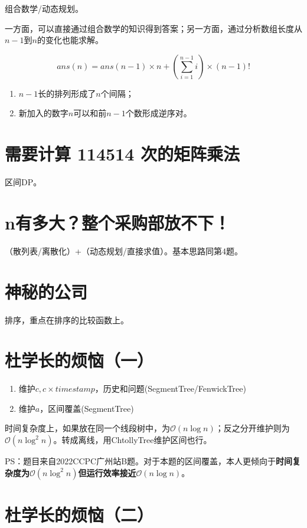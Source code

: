\documentclass[12pt, UTF8]{ctexart}
\theoremstyle{mystyle}
\begin{document}
组合数学/动态规划。\par
一方面，可以直接通过组合数学的知识得到答案；另一方面，通过分析数组长度从$n-1$到$n$的变化也能求解。

\[
  ans(n) = ans(n-1)\times n + (\sum_{i=1}^{n-1}i)\times (n-1)!
\]

\begin{enumerate}[noitemsep]
  \item $n-1$长的排列形成了$n$个间隔；
  \item 新加入的数字$n$可以和前$n-1$个数形成逆序对。
\end{enumerate}

\section{需要计算 114514 次的矩阵乘法}

区间DP。

\section{n有多大？整个采购部放不下！}

（散列表/离散化）+（动态规划/直接求值）。基本思路同第4题。

\section{神秘的公司}

排序，重点在排序的比较函数上。

\section{杜学长的烦恼（一）}

\begin{enumerate}[noitemsep]
  \item 维护$c,c\times timestamp$，历史和问题(SegmentTree/FenwickTree)
  \item 维护$a$，区间覆盖(SegmentTree)
\end{enumerate}

时间复杂度上，如果放在同一个线段树中，为$\mathcal{O}(n\log{n})$；反之分开维护则为$\mathcal{O}(n\log^2{n})$。转成离线，用ChtollyTree维护区间也行。\par
PS：题目来自2022CCPC广州站B题。对于本题的区间覆盖，本人更倾向于\textbf{时间复杂度为$\mathcal{O}(n\log^2 n)$但运行效率接近$\mathcal{O}(n\log n)$}。

\section{杜学长的烦恼（二）}
\end{document}
